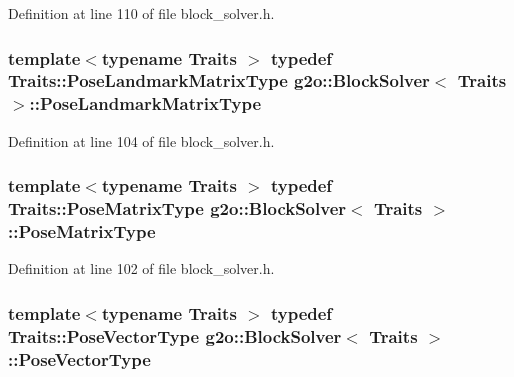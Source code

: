 Definition at line 110 of file block\+\_\+solver.\+h.

\subsubsection[{\texorpdfstring{Pose\+Landmark\+Matrix\+Type}{PoseLandmarkMatrixType}}]{\setlength{\rightskip}{0pt plus 5cm}template$<$typename Traits $>$ typedef Traits\+::\+Pose\+Landmark\+Matrix\+Type {\bf g2o\+::\+Block\+Solver}$<$ Traits $>$\+::{\bf Pose\+Landmark\+Matrix\+Type}}\hypertarget{classg2o_1_1BlockSolver_a96bf60b923f816086cd2f24de38736ec}{}\label{classg2o_1_1BlockSolver_a96bf60b923f816086cd2f24de38736ec}


Definition at line 104 of file block\+\_\+solver.\+h.

\subsubsection[{\texorpdfstring{Pose\+Matrix\+Type}{PoseMatrixType}}]{\setlength{\rightskip}{0pt plus 5cm}template$<$typename Traits $>$ typedef Traits\+::\+Pose\+Matrix\+Type {\bf g2o\+::\+Block\+Solver}$<$ Traits $>$\+::{\bf Pose\+Matrix\+Type}}\hypertarget{classg2o_1_1BlockSolver_a8c7c43d361bd31e3e0353889ba703bc0}{}\label{classg2o_1_1BlockSolver_a8c7c43d361bd31e3e0353889ba703bc0}


Definition at line 102 of file block\+\_\+solver.\+h.

\subsubsection[{\texorpdfstring{Pose\+Vector\+Type}{PoseVectorType}}]{\setlength{\rightskip}{0pt plus 5cm}template$<$typename Traits $>$ typedef Traits\+::\+Pose\+Vector\+Type {\bf g2o\+::\+Block\+Solver}$<$ Traits $>$\+::{\bf Pose\+Vector\+Type}}\hypertarget{classg2o_1_1BlockSolver_a65d51b9281e2e2597df05eb00801ee76}{}\label{classg2o_1_1BlockSolver_a65d51b9281e2e2597df05eb00801ee76}


